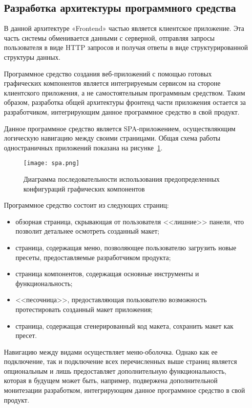 \subsection{Разработка архитектуры программного средства}
\label{sec:modeling:sequence_diagram}

В данной архитектуре «Frontend» частью является клиентское приложение. Эта часть системы обменивается данными с серверной, отправляя запросы пользователя в виде HTTP запросов и получая ответы в виде структурированной структуры данных. 

Программное средство создания веб-приложений с помощью готовых графических компонентов является интегрируемым сервисом на стороне клиентского приложения, а не самостоятельным программным средством. Таким образом, разработка общей архитектуры фронтенд части приложения остается за разработчиком, интегрирующим данное программное средство в свой продукт.

Данное программное средство является SPA-приложением, осуществляющим логическую навигацию между своими страницами. Общая схема работы одностраничных приложений показана на рисунке~\ref{sec:design:spa}.
\begin{figure}[ht]
\centering
    \texttt{[image: spa.png]}
    \caption{Диаграмма последовательности использования предопределенных конфигураций графических компонентов}
    \label{sec:design:spa}
\end{figure}

Программное средство состоит из следующих страниц:

\begin{itemize}
    \item обзорная страница, скрывающая от пользователя <<лишние>> панели, что позволит детальнее осмотреть созданный макет;
    \item страница, содержащая меню, позволяющее пользователю загрузить новые пресеты, предоставляемые разработчиком продукта;
    \item страница компонентов, содержащая основные инструменты и функциональность;
    \item <<песочница>>, предоставляющая пользователю возможность протестировать созданный макет приложения;
    \item страница, содержащая сгенерированный код макета, сохранить макет как пресет.
\end{itemize}

Навигацию между видами осуществляет меню-оболочка. Однако как ее подключение, так и подключение всех перечисленных выше страниц является опциональным и лишь предоставляет дополнительную функциональность, которая в будущем может быть, например, подвержена дополнительной монитезации разработком, интегрирующим данное программное средство в свой продукт.

